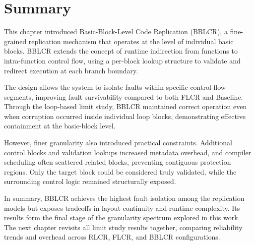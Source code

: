 \section*{Summary}
This chapter introduced Basic-Block-Level Code Replication (BBLCR),
a fine-grained replication mechanism that operates at the level of individual
basic blocks. BBLCR extends the concept of runtime indirection from functions
to intra-function control flow, using a per-block lookup structure to
validate and redirect execution at each branch boundary.

The design allows the system to isolate faults within specific control-flow
segments, improving fault survivability compared to both FLCR and Baseline.
Through the loop-based limit study, BBLCR maintained correct operation even
when corruption occurred inside individual loop blocks, demonstrating effective
containment at the basic-block level.

However, finer granularity also introduced practical constraints.
Additional control blocks and validation lookups increased metadata overhead,
and compiler scheduling often scattered related blocks, preventing contiguous
protection regions. Only the target block could be considered truly validated,
while the surrounding control logic remained structurally exposed.

In summary, BBLCR achieves the highest fault isolation among the replication
models but exposes tradeoffs in layout continuity and runtime complexity.
Its results form the final stage of the granularity spectrum explored in this work.
The next chapter revisits all limit study results together, comparing
reliability trends and overhead across RLCR, FLCR, and BBLCR configurations.